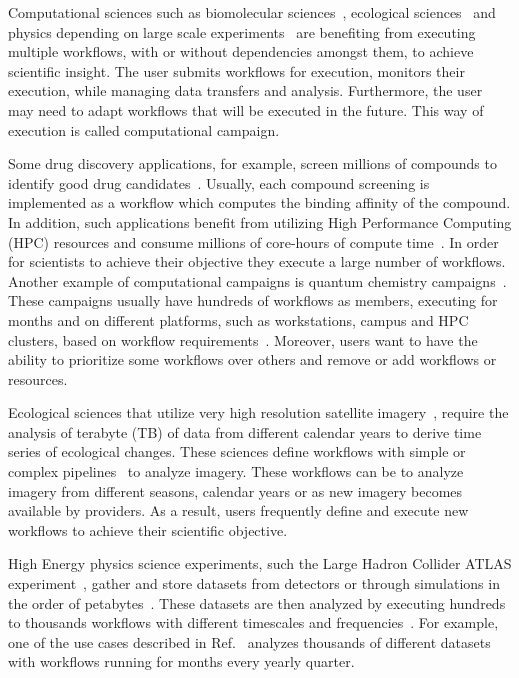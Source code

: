 \label{ch:intro}
Computational sciences such as biomolecular sciences~\cite{cheatham2015impact, dakka2018concurrent}, ecological sciences~\cite{goncalves2020sealnet, paraskevakos2019workflow} and physics depending on large scale experiments~\cite{atlas} are benefiting from executing multiple workflows, with or without dependencies amongst them, to achieve scientific insight.
The user submits workflows for execution, monitors their execution, while managing data transfers and analysis.
Furthermore, the user may need to adapt workflows that will be executed in the future.
This way of execution is called computational campaign.

Some drug discovery applications, for example, screen millions of compounds to identify good drug candidates~\cite{dakka2018concurrent}.
Usually, each compound screening is implemented as a workflow which computes the binding affinity of the compound.
In addition, such applications benefit from utilizing High Performance Computing (HPC) resources and consume millions of core-hours of compute time~\cite{cheatham2015impact}.
In order for scientists to achieve their objective they execute a large number of workflows.
Another example of computational campaigns is quantum chemistry campaigns~\cite{smith2020molssi}.
These campaigns usually have hundreds of workflows as members, executing for months and on different platforms, such as workstations, campus and HPC clusters, based on workflow requirements~\cite{smith2020molssi}.
Moreover, users want to have the ability to prioritize some workflows over others and remove or add workflows or resources.

Ecological sciences that utilize very high resolution satellite imagery~\cite{goncalves2020sealnet}, require the analysis of terabyte (TB) of data from different calendar years to derive time series of ecological changes.
These sciences define workflows with simple or complex pipelines~\cite{paraskevakos2019workflow} to analyze imagery.
These workflows can be to analyze imagery from different seasons, calendar years or as new imagery becomes available by providers.
As a result, users frequently define and execute new workflows to achieve their scientific objective.

High Energy physics science experiments, such the Large Hadron Collider ATLAS experiment~\cite{atlas}, gather and store datasets from detectors or through simulations in the order of petabytes~\cite{borodin2015big}.
These datasets are then analyzed by executing hundreds to thousands workflows with different timescales and frequencies~\cite{borodin2015big}.
For example, one of the use cases described in Ref.~\cite{borodin2015big} analyzes thousands of different datasets with workflows running for months every yearly quarter.

